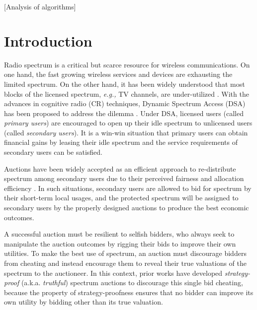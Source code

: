 \documentclass{sig-alternate}
\begin{document}
[Analysis of algorithms]

\section{Introduction}
Radio spectrum is a critical but scarce resource for wireless communications. On one hand, the fast growing wireless services and devices are exhausting the limited spectrum. On the other hand, it has been widely understood that most blocks of the licensed spectrum, \emph{e.g.,} TV channels, are under-utilized \cite{WT:06}. With the advances in cognitive radio (CR) techniques, Dynamic Spectrum Access (DSA) has been proposed to address the dilemma \cite{survey:06}. Under DSA, licensed users (called \emph{primary users}) are encouraged to open up their idle spectrum to unlicensed users (called \emph{secondary users}). It is a win-win situation that primary users can obtain financial gains by leasing their idle spectrum and the service requirements of secondary users can be satisfied.

Auctions have been widely accepted as an efficient approach to re-distribute spectrum among secondary users due to their perceived fairness and allocation efficiency \cite{PUP:04}. In such situations, secondary users are allowed to bid for spectrum by their short-term local usages, and the protected spectrum will be assigned to secondary users by the properly designed auctions to produce the best economic outcomes.


A successful auction must be resilient to selfish bidders, who always seek to manipulate the auction outcomes by rigging their bids to improve their own utilities. To make the best use of spectrum, an auction must discourage bidders from cheating and instead encourage them to reveal their true valuations of the spectrum to the auctioneer. In this context, prior works have developed \emph{strategy-proof} (a.k.a. \emph{truthful}) spectrum auctions \cite{Mobicom08:Zhou,Mobihoc09:Jia,Gupta11:Info,Wu:11:INFOCOM} to discourage this single bid cheating, because the property of strategy-proofness ensures that no bidder can improve its own utility by bidding other than its true valuation.

\end{document}
